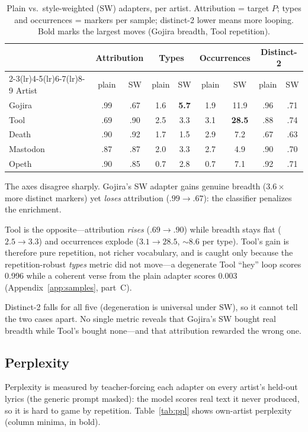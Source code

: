 \documentclass[runningheads]{llncs}
\begin{document}
\begin{table}[t]
\centering
\caption{Plain vs.\ style-weighted (SW) adapters, per artist. Attribution = target $P$; types and occurrences = markers per sample; distinct-2 lower means more looping. Bold marks the largest moves (Gojira breadth, Tool repetition).}
\label{tab:sw}
\small
\setlength{\tabcolsep}{5pt}
\begin{tabular}{l cc cc cc cc}
\toprule
& \multicolumn{2}{c}{\textbf{Attribution}} & \multicolumn{2}{c}{\textbf{Types}} & \multicolumn{2}{c}{\textbf{Occurrences}} & \multicolumn{2}{c}{\textbf{Distinct-2}} \\
\cmidrule(lr){2-3}\cmidrule(lr){4-5}\cmidrule(lr){6-7}\cmidrule(lr){8-9}
Artist & plain & SW & plain & SW & plain & SW & plain & SW \\
\midrule
Gojira   & .99 & .67 & 1.6 & \textbf{5.7} & 1.9 & 11.9 & .96 & .71 \\
Tool     & .69 & .90 & 2.5 & 3.3 & 3.1 & \textbf{28.5} & .88 & .74 \\
Death    & .90 & .92 & 1.7 & 1.5 & 2.9 & 7.2 & .67 & .63 \\
Mastodon & .87 & .87 & 2.0 & 3.3 & 2.7 & 4.9 & .90 & .70 \\
Opeth    & .90 & .85 & 0.7 & 2.8 & 0.7 & 7.1 & .92 & .71 \\
\bottomrule
\end{tabular}
\end{table}

The axes disagree sharply. Gojira's SW adapter gains genuine breadth ($3.6\times$ more distinct markers) yet \emph{loses} attribution ($.99\!\rightarrow\!.67$): the classifier penalizes the enrichment.

Tool is the opposite---attribution \emph{rises} ($.69\!\rightarrow\!.90$) while breadth stays flat ($2.5\!\rightarrow\!3.3$) and occurrences explode ($3.1\!\rightarrow\!28.5$, $\sim\!8.6$ per type). Tool's gain is therefore pure repetition, not richer vocabulary, and is caught only because the repetition-robust \emph{types} metric did not move---a degenerate Tool ``hey'' loop scores 0.996 while a coherent verse from the plain adapter scores 0.003 (Appendix~\ref{app:samples}, part~C).

Distinct-2 falls for all five (degeneration is universal under SW), so it cannot tell the two cases apart. No single metric reveals that Gojira's SW bought real breadth while Tool's bought none---and that attribution rewarded the wrong one.

\subsection{Perplexity}
\label{sec:ppl}
Perplexity is measured by teacher-forcing each adapter on every artist's held-out lyrics (the generic prompt masked): the model scores real text it never produced, so it is hard to game by repetition. Table~\ref{tab:ppl} shows own-artist perplexity (column minima, in bold).
\end{document}
